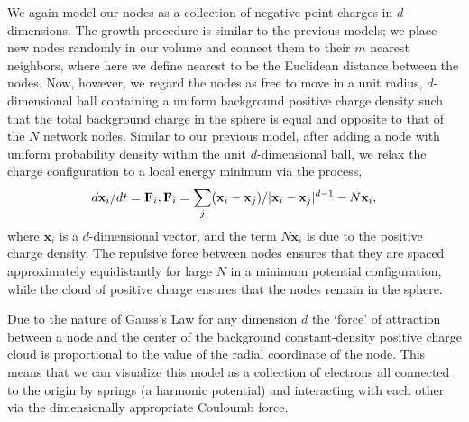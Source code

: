 \documentclass[aps,pre,reprint,superscriptaddress,amsmath,amssymb,nofootinbib]{revtex4-1}
\begin{document}
We again model our nodes as a collection of negative point charges in $d$-dimensions.
The growth procedure is similar to the previous models; we place new nodes randomly in our volume and connect them to their $m$ nearest neighbors, where here we define nearest to be the Euclidean distance between the nodes.
Now, however, we regard the nodes as free to move in a unit radius, $d$-dimensional ball containing a uniform background positive charge density such that the total background charge in the sphere is equal and opposite to that of the $N$ network nodes.
Similar to our previous model, after adding a node with uniform probability density within the unit $d$-dimensional ball, we relax the charge configuration to a local energy minimum via the process,
\begin{equation}
d\textbf{x}_i/dt = \textbf{F}_i,\\
\textbf{F}_i = \sum_{j} (\textbf{x}_i - \textbf{x}_j)/|\textbf{x}_i-\textbf{x}_j|^{d-1} - N\textbf{x}_i,
\end{equation}
where $\textbf{x}_i$ is a $d$-dimensional vector, and the term $N\textbf{x}_i$ is due to the positive charge density.
The repulsive force between nodes ensures that they are spaced approximately equidistantly for large $N$ in a minimum potential configuration, while the cloud of positive charge ensures that the nodes remain in the sphere.

Due to the nature of Gauss's Law for any dimension $d$ the `force' of attraction between a node and the center of the background constant-density positive charge cloud is proportional to the value of the radial coordinate of the node.
This means that we can visualize this model as a collection of electrons all connected to the origin by springs (a harmonic potential) and interacting with each other via the dimensionally appropriate Couloumb force.  
\end{document}
